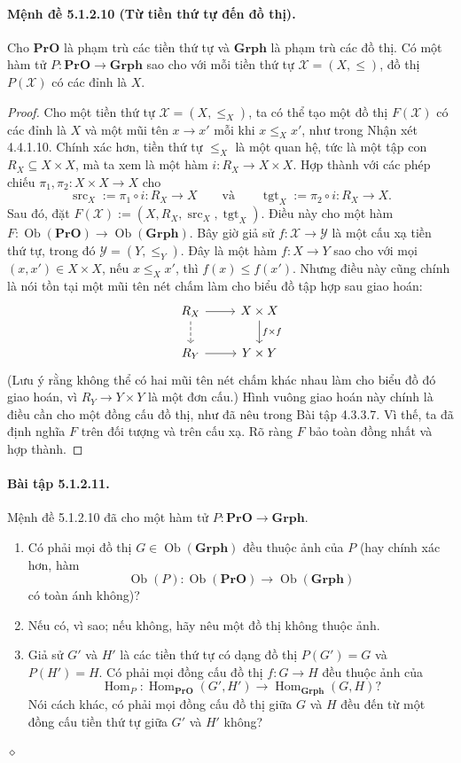 \paragraph{Mệnh đề 5.1.2.10 (Từ tiền thứ tự đến đồ thị).} Cho $\mathbf{PrO}$ là phạm trù các tiền thứ tự và $\mathbf{Grph}$ là phạm trù các đồ thị. Có một hàm tử $P:\mathbf{PrO}\to\mathbf{Grph}$ sao cho với mỗi tiền thứ tự $\mathcal X=(X,\leq)$, đồ thị $P(\mathcal X)$ có các đỉnh là $X$.
\begin{proof}
Cho một tiền thứ tự $\mathcal X=(X,\leq_X)$, ta có thể tạo một đồ thị $F(\mathcal X)$ có các đỉnh là $X$ và một mũi tên $x\to x'$ mỗi khi $x\leq_X x'$, như trong Nhận xét 4.4.1.10. Chính xác hơn, tiền thứ tự $\leq_X$ là một quan hệ, tức là một tập con $R_X\subseteq X\times X$, mà ta xem là một hàm $i:R_X\to X\times X$. Hợp thành với các phép chiếu $\pi_1,\pi_2:X\times X\to X$ cho
\[\operatorname{src}_X:=\pi_1\circ i:R_X\to X\qquad\text{và}\qquad\operatorname{tgt}_X:=\pi_2\circ i:R_X\to X.\]
Sau đó, đặt $F(\mathcal X):=(X,R_X,\operatorname{src}_X,\operatorname{tgt}_X)$. Điều này cho một hàm $F:\operatorname{Ob}(\mathbf{PrO})\to\operatorname{Ob}(\mathbf{Grph})$.
Bây giờ giả sử $f:\mathcal X\to\mathcal Y$ là một cấu xạ tiền thứ tự, trong đó $\mathcal Y=(Y,\leq_Y)$. Đây là một hàm $f:X\to Y$ sao cho với mọi $(x,x')\in X\times X$, nếu $x\leq_X x'$, thì $f(x)\leq f(x')$. Nhưng điều này cũng chính là nói tồn tại một mũi tên nét chấm làm cho biểu đồ tập hợp sau giao hoán:
\[\begin{tikzcd}
R_X\arrow[r]\arrow[d,dashed]&X\times X\arrow[d,"f\times f"]\\
R_Y\arrow[r]&Y\times Y
\end{tikzcd}\]
(Lưu ý rằng không thể có hai mũi tên nét chấm khác nhau làm cho biểu đồ đó giao hoán, vì $R_Y\to Y\times Y$ là một đơn cấu.) Hình vuông giao hoán này chính là điều cần cho một đồng cấu đồ thị, như đã nêu trong Bài tập 4.3.3.7. Vì thế, ta đã định nghĩa $F$ trên đối tượng và trên cấu xạ. Rõ ràng $F$ bảo toàn đồng nhất và hợp thành.
\end{proof}
\paragraph{Bài tập 5.1.2.11.} Mệnh đề 5.1.2.10 đã cho một hàm tử $P:\mathbf{PrO}\to\mathbf{Grph}$.
\begin{enumerate}[label=\alph*.]
\item Có phải mọi đồ thị $G\in\operatorname{Ob}(\mathbf{Grph})$ đều thuộc ảnh của $P$ (hay chính xác hơn, hàm
\[\operatorname{Ob}(P):\operatorname{Ob}(\mathbf{PrO})\to\operatorname{Ob}(\mathbf{Grph})\]
có toàn ánh không)?
\item Nếu có, vì sao; nếu không, hãy nêu một đồ thị không thuộc ảnh.
\item Giả sử $G'$ và $H'$ là các tiền thứ tự có dạng đồ thị $P(G')=G$ và $P(H')=H$. Có phải mọi đồng cấu đồ thị $f:G\to H$ đều thuộc ảnh của
\[\operatorname{Hom}_P:\operatorname{Hom}_{\mathbf{PrO}}(G',H')\longrightarrow\operatorname{Hom}_{\mathbf{Grph}}(G,H)?\]
Nói cách khác, có phải mọi đồng cấu đồ thị giữa $G$ và $H$ đều đến từ một đồng cấu tiền thứ tự giữa $G'$ và $H'$ không?
\end{enumerate}\hfill$\diamond$
